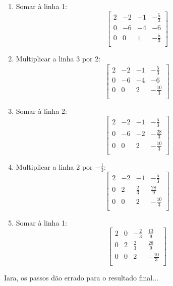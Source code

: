 \begin{enumerate}
	\item Somar à linha 1:
	\[
	\begin{bmatrix}
		2 & -2 & -1 & -\frac{5}{3} \\
		0 & -6 & -4 & -6 \\
		0 & 0 & 1 & -\frac{5}{3} \\
	\end{bmatrix}
	\]
	
	\item Multiplicar a linha 3 por 2:
	\[
	\begin{bmatrix}
		2 & -2 & -1 & -\frac{5}{3} \\
		0 & -6 & -4 & -6 \\
		0 & 0 & 2 & -\frac{10}{3} \\
	\end{bmatrix}
	\]
	
	\item Somar à linha 2:
	\[
	\begin{bmatrix}
		2 & -2 & -1 & -\frac{5}{3} \\
		0 & -6 & -2 & -\frac{28}{3} \\
		0 & 0 & 2 & -\frac{10}{3} \\
	\end{bmatrix}
	\]
	
	\item Multiplicar a linha 2 por $-\frac{1}{3}$:
	\[
	\begin{bmatrix}
		2 & -2 & -1 & -\frac{5}{3} \\
		0 & 2 & \frac{2}{3} & \frac{28}{9} \\
		0 & 0 & 2 & -\frac{10}{3} \\
	\end{bmatrix}
	\]
	
	\item Somar à linha 1:
	\[
	\begin{bmatrix}
		2 & 0 & -\frac{2}{3} & \frac{13}{9} \\
		0 & 2 & \frac{2}{3} & \frac{28}{9} \\
		0 & 0 & 2 & -\frac{10}{3} \\
	\end{bmatrix}
	\]
\end{enumerate}

Iara, os passos dão errado para o resultado final...

 
